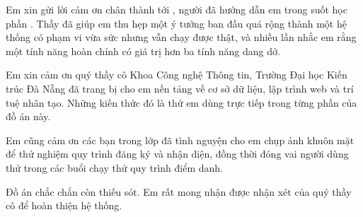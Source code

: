 \begin{acknowledgments}

Em xin gửi lời cảm ơn chân thành tới \dauGVHD, người đã hướng dẫn em trong
suốt học phần \dauMonHoc. Thầy đã giúp em thu hẹp một ý tưởng ban đầu quá
rộng thành một hệ thống có phạm vi vừa sức nhưng vẫn chạy được thật, và
nhiều lần nhắc em rằng một tính năng hoàn chỉnh có giá trị hơn ba tính năng
dang dở.

Em xin cảm ơn quý thầy cô Khoa Công nghệ Thông tin, Trường Đại học Kiến trúc
Đà Nẵng đã trang bị cho em nền tảng về cơ sở dữ liệu, lập trình web và trí
tuệ nhân tạo. Những kiến thức đó là thứ em dùng trực tiếp trong từng phần
của đồ án này.

Em cũng cảm ơn các bạn trong lớp \dauLop{} đã tình nguyện cho em chụp ảnh
khuôn mặt để thử nghiệm quy trình đăng ký và nhận diện, đồng thời đóng vai
người dùng thử trong các buổi chạy thử quy trình điểm danh.

Đồ án chắc chắn còn thiếu sót. Em rất mong nhận được nhận xét của quý thầy
cô để hoàn thiện hệ thống.

\vspace{1.4em}
\hfill{}

\end{acknowledgments}
